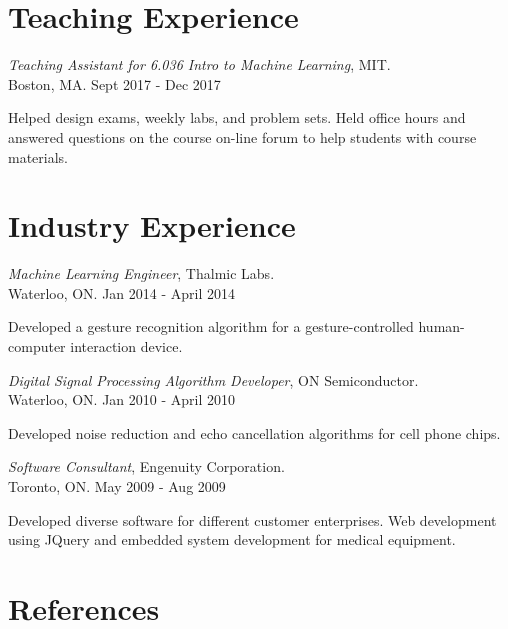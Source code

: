 \documentclass[line,margin,letterpaper]{res}
\begin{document}
\begin{resume}
\section{Teaching Experience}
{\sl Teaching Assistant for 6.036 Intro to Machine Learning}, MIT.
\\ \hfill Boston, MA. Sept 2017 - Dec 2017
\begin{list}{}
\item  Helped design exams, weekly labs, and problem sets. Held office hours
and answered questions on the course on-line forum to help students with course
materials.
\end{list}

\section{Industry Experience}
{\sl Machine Learning Engineer}, Thalmic Labs.
\\ \hfill Waterloo, ON. Jan 2014 - April 2014
\begin{list}{}
\item  Developed a gesture recognition algorithm for a gesture-controlled human-computer interaction device.
\end{list}

{\sl Digital Signal Processing Algorithm Developer}, ON Semiconductor.
\\ \hfill Waterloo, ON. Jan 2010 - April 2010
\begin{list}{}
\item Developed noise reduction and echo cancellation algorithms for cell phone chips.
\end{list}

{\sl Software Consultant}, Engenuity Corporation.
\\ \hfill Toronto, ON. May 2009 - Aug 2009
\begin{list}{}
\item Developed diverse software for different customer enterprises. Web development using JQuery and embedded system development for medical equipment.
\end{list}


\iffalse
\section{References}


\end{resume}
\end{document}
